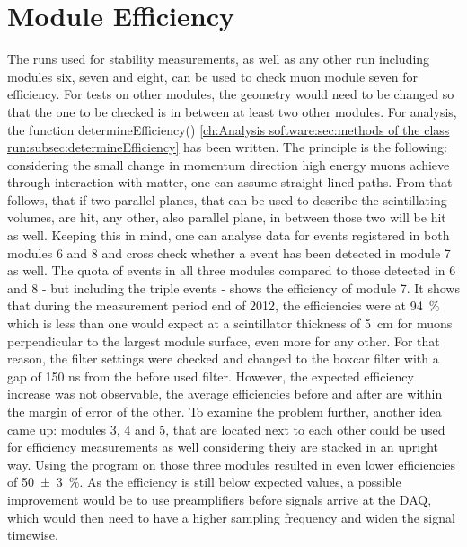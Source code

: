  \section{Module Efficiency}
  \label{ch:Analysis:sec:Module Efficiency}
  The runs used for stability measurements, as well as any other run including modules six, seven and eight, can be used to check muon module seven for efficiency. For tests on other modules, the geometry would need to be changed so that the one to be checked is in between at least two other modules.
  For analysis, the function determineEfficiency() \ref{ch:Analysis software:sec:methods of the class run:subsec:determineEfficiency}
  has been written.
  The principle is the following: considering the small change in momentum direction high energy muons achieve through interaction with matter, one can assume straight-lined paths. From that follows, that if two parallel planes, that can be used to describe the scintillating volumes, are hit, any other, also parallel plane, in between those two will be hit as well. Keeping this in mind, one can analyse data for events registered in both modules 6 and 8 and cross check whether a event has been detected in module 7 as well. The quota of events in all three modules compared to those detected in 6 and 8 - but including the triple events - shows the efficiency of module 7.
  It shows that during the measurement period end of 2012, the efficiencies were at  \SI{94 }{\percent} which is less than one would expect at a scintillator thickness of \SI{5}{\centi\meter} for muons perpendicular to the largest module surface, even more for any other.
  For that reason, the filter settings were checked and changed to the boxcar filter with a gap of 150 ns from the before used  filter. However, the expected efficiency increase was not observable, the average efficiencies before and after are within the margin of error of the other.
  To examine the problem further, another idea came up: modules 3, 4 and 5, that are located next to each other could be used for efficiency measurements as well considering theiy are stacked in an upright way. Using the program on those three modules resulted in even lower efficiencies of \SI{50(3)}{\percent}.
  As the efficiency is still below expected values, a possible improvement would be to use preamplifiers before signals arrive at the DAQ, which would then need to have a higher sampling frequency and widen the signal timewise.
  
